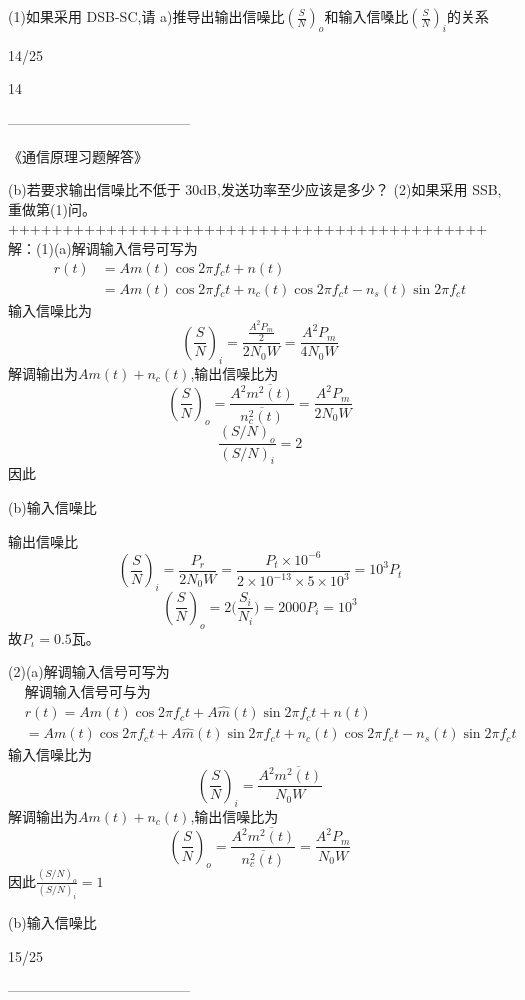 \documentclass[utf8]{article}
\begin{document}
(1)如果采用 DSB-SC,请
a)推导出输出信噪比$\left(\frac SN\right)_o$和输入信嗓比$\left(\frac SN\right)_i$的关系

14/25

14

---------------------------------------

《通信原理习题解答》

(b)若要求输出信噪比不低于 30dB,发送功率至少应该是多少？
(2)如果采用 SSB,重做第(1)问。
++++++++++++++++++++++++++++++++++++++++++++\\
解：(1)(a)解调输入信号可写为
$$\begin{aligned}r\left(t\right)&=Am\left(t\right)\cos2\pi f_{c}t+n\left(t\right)\\&=Am\left(t\right)\cos2\pi f_{c}t+n_{c}\left(t\right)\cos2\pi f_{c}t-n_{s}\left(t\right)\sin2\pi f_{c}t\end{aligned}$$
输入信噪比为
$$\left(\frac{S}{N}\right)_i=\frac{\frac{A^2P_m}{2}}{2N_0W}=\frac{A^2P_m}{4N_0W}$$
解调输出为$Am(t)+n_c(t)$,输出信噪比为
$$\left(\frac{S}{N}\right)_{o}=\frac{A^{2}\overline{m^{2}\left(t\right)}}{\overline{n_{c}^{2}\left(t\right)}}=\frac{A^{2}P_{m}}{2N_{0}W}$$
$$\frac{\left(S/N\right)_o}{\left(S/N\right)_i}=2$$
因此


(b)输入信噪比

输出信噪比
$$\left(\dfrac{S}{N}\right)_i=\dfrac{P_r}{2N_0W}=\dfrac{P_t\times10^{-6}}{2\times10^{-13}\times5\times10^3}=10^3P_t$$
$$\left(\dfrac{S}{N}\right)_o=2\Bigg(\dfrac{S_i}{N_i}\Bigg)=2000P_i=10^3$$
故$P_{\iota}=0.5$瓦。

(2)(a)解调输入信号可写为
$$\begin{aligned}&\text{解调输入信号可与为}\\&r\left(t\right)=Am\left(t\right)\cos2\pi f_{c}t+A\hat{m}\left(t\right)\sin2\pi f_{c}t+n\left(t\right)\\&=Am\left(t\right)\cos2\pi f_{c}t+A\hat{m}\left(t\right)\sin2\pi f_{c}t+n_{c}\left(t\right)\cos2\pi f_{c}t-n_{s}\left(t\right)\sin2\pi f_{c}t\end{aligned}$$
输入信噪比为
$$\left(\frac{S}{N}\right)_{i}=\frac{A^{2}\overline{m^{2}\left(t\right)}}{N_{0}W}$$
解调输出为$Am(t)+n_c(t)$,输出信噪比为
$$\left(\frac{S}{N}\right)_{o}=\frac{A^{2}\overline{m^{2}\left(t\right)}}{\overline{n_{c}^{2}\left(t\right)}}=\frac{A^{2}P_{m}}{N_{0}W}$$
因此$\frac{\left(S/N\right)_o}{\left(S/N\right)_i}=1$

(b)输入信噪比

15/25

---------------------------------------
\end{document}
